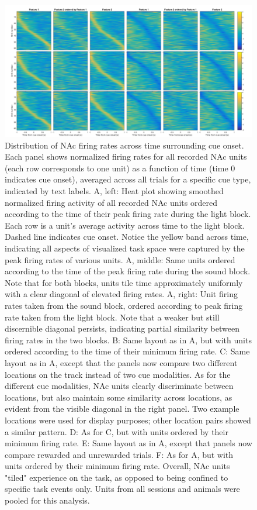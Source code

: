 \documentclass[11pt]{article}
\begin{document}
\begin{figure}[h]
\centering
\includegraphics[width=\textwidth]{Fig 8 - Task tiling.png}
\caption{Distribution of NAc firing rates across time surrounding cue onset. Each panel shows normalized firing rates for all recorded NAc units (each row corresponds to one unit) as a function of time (time 0 indicates cue onset), averaged across all trials for a specific cue type, indicated by text labels. A, left: Heat plot showing smoothed normalized firing activity of all recorded NAc units ordered according to the time of their peak firing rate during the light block. Each row is a unit’s average activity across time to the light block. Dashed line indicates cue onset. Notice the yellow band across time, indicating all aspects of visualized task space were captured by the peak firing rates of various units. A, middle: Same units ordered according to the time of the peak firing rate during the sound block. Note that for both blocks, units tile time approximately uniformly with a clear diagonal of elevated firing rates. A, right: Unit firing rates taken from the sound block, ordered according to peak firing rate taken from the light block. Note that a weaker but still discernible diagonal persists, indicating partial similarity between firing rates in the two blocks. B: Same layout as in A, but with units ordered according to the time of their minimum firing rate. C: Same layout as in A, except that the panels now compare two different locations on the track instead of two cue modalities. As for the different cue modalities, NAc units clearly discriminate between locations, but also maintain some similarity across locations, as evident from the visible diagonal in the right panel. Two example locations were used for display purposes; other location pairs showed a similar pattern. D: As for C, but with units ordered by their minimum firing rate. E: Same layout as in A, except that panels now compare rewarded and unrewarded trials. F: As for A, but with units ordered by their minimum firing rate. Overall, NAc units "tiled" experience on the task, as opposed to being confined to specific task events only. Units from all sessions and animals were pooled for this analysis.}
\label{fig:tiling}
\end{figure}
 
\end{document}
